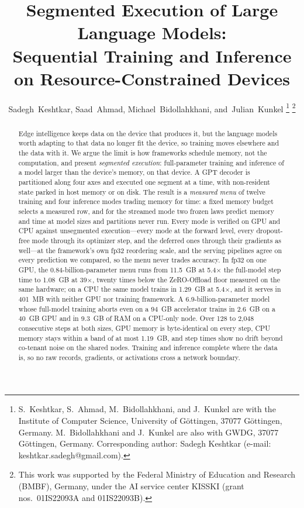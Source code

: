 \documentclass[journal]{IEEEtran}
\begin{document}
\title{Segmented Execution of Large Language Models:\\
Sequential Training and Inference on Resource-Constrained Devices}

\author{%
Sadegh~Keshtkar,
Saad~Ahmad,
Michael~Bidollahkhani,
and~Julian~Kunkel%
\thanks{S.~Keshtkar, S.~Ahmad, M.~Bidollahkhani, and J.~Kunkel are with the
Institute of Computer Science, University of G\"ottingen, 37077 G\"ottingen,
Germany. M.~Bidollahkhani and J.~Kunkel are also with GWDG, 37077
G\"ottingen, Germany. Corresponding author: Sadegh Keshtkar (e-mail:
keshtkar.sadegh@gmail.com).}%
\thanks{This work was supported by the Federal Ministry of Education and
Research (BMBF), Germany, under the AI service center KISSKI (grant nos.\
01IS22093A and 01IS22093B).}%
}


\maketitle

\begin{abstract}
Edge intelligence keeps data on the device that produces it, but the
language models worth adapting to that data no longer fit the device, so
training moves elsewhere and the data with it. We argue the limit is how
frameworks schedule memory, not the computation, and present
\emph{segmented execution}: full-parameter training and inference of a
model larger than the device's memory, on that device. A GPT decoder is
partitioned along four axes and executed one segment at a time, with
non-resident state parked in host memory or on disk. The result is a
\emph{measured menu} of twelve training and four inference modes trading
memory for time: a fixed memory budget selects a measured row, and for the
streamed mode two frozen laws predict memory and time at model sizes and
partitions never run. Every mode is verified on GPU and CPU against unsegmented
execution---every mode at the forward level, every dropout-free mode through its
optimizer step, and the deferred ones through their gradients as well---at the
framework's own fp32 reordering scale, and the serving pipelines agree on every
prediction we compared, so the menu never
trades accuracy. In fp32 on one GPU, the 0.84-billion-parameter menu runs from
11.5~GB at 5.4$\times$ the full-model step time to 1.08~GB at 39$\times$,
twenty times below the ZeRO-Offload floor measured on the same hardware; on a
CPU the same model trains in 1.29~GB at 5.4$\times$, and it serves in
401~MB with neither GPU nor training framework. A 6.9-billion-parameter
model whose full-model training aborts even on a 94~GB accelerator trains
in 2.6~GB on a 40~GB GPU and in 9.3~GB of RAM on a CPU-only node. Over 128
to 2{,}048 consecutive steps at both sizes, GPU memory is byte-identical on
every step, CPU memory stays within a band of at most 1.19~GB, and step
times show no drift beyond co-tenant noise on the shared nodes. Training
and inference complete where the data is, so no raw records, gradients, or
activations cross a network boundary.
\end{abstract}
\end{document}
